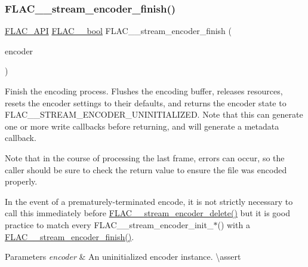 \subsubsection{\texorpdfstring{FLAC\_\_stream\_encoder\_finish()}{FLAC\_\_stream\_encoder\_finish()}}
{\footnotesize\ttfamily \mbox{\hyperlink{group__flac__export_ga56ca07df8a23310707732b1c0007d6f5}{F\+L\+A\+C\+\_\+\+A\+PI}} \mbox{\hyperlink{ordinals_8h_a95103469f1cbd78b8cf250194985b34e}{F\+L\+A\+C\+\_\+\+\_\+bool}} F\+L\+A\+C\+\_\+\+\_\+stream\+\_\+encoder\+\_\+finish (\begin{DoxyParamCaption}\item[{\mbox{\hyperlink{struct_f_l_a_c_____stream_encoder}{F\+L\+A\+C\+\_\+\+\_\+\+Stream\+Encoder}} $\ast$}]{encoder }\end{DoxyParamCaption})}

Finish the encoding process. Flushes the encoding buffer, releases resources, resets the encoder settings to their defaults, and returns the encoder state to F\+L\+A\+C\+\_\+\+\_\+\+S\+T\+R\+E\+A\+M\+\_\+\+E\+N\+C\+O\+D\+E\+R\+\_\+\+U\+N\+I\+N\+I\+T\+I\+A\+L\+I\+Z\+ED. Note that this can generate one or more write callbacks before returning, and will generate a metadata callback.

Note that in the course of processing the last frame, errors can occur, so the caller should be sure to check the return value to ensure the file was encoded properly.

In the event of a prematurely-\/terminated encode, it is not strictly necessary to call this immediately before \mbox{\hyperlink{group__flac__stream__encoder_ga9c9956af42bebe923da59437628aa9ea}{F\+L\+A\+C\+\_\+\+\_\+stream\+\_\+encoder\+\_\+delete()}} but it is good practice to match every F\+L\+A\+C\+\_\+\+\_\+stream\+\_\+encoder\+\_\+init\+\_\+$\ast$() with a \mbox{\hyperlink{group__flac__stream__encoder_gab2c1e5477c1e3fe9ad0d722ff8eecda2}{F\+L\+A\+C\+\_\+\+\_\+stream\+\_\+encoder\+\_\+finish()}}.


\begin{DoxyParams}{Parameters}
{\em encoder} & An uninitialized encoder instance. \textbackslash{}assert 
\begin{DoxyCode}{1}
\end{DoxyCode}
 \\
\hline
\end{DoxyParams}

